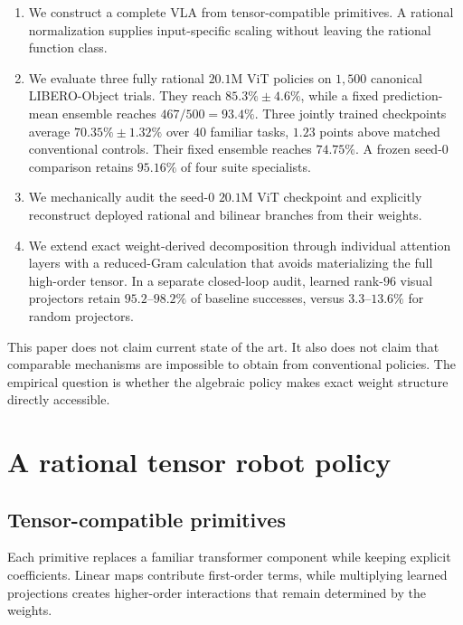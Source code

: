 \documentclass{article}
\begin{document}
\begin{enumerate}
  \item We construct a complete VLA from tensor-compatible primitives. A rational normalization
        supplies input-specific scaling without leaving the rational function class.
  \item We evaluate three fully rational $20.1$M ViT policies on $1{,}500$ canonical
        LIBERO-Object trials. They reach $85.3\%\pm4.6\%$, while a fixed prediction-mean
        ensemble reaches $467/500=93.4\%$. Three jointly trained checkpoints average
        $70.35\%\pm1.32\%$ over $40$ familiar tasks, $1.23$ points above matched
        conventional controls. Their fixed ensemble reaches
        $74.75\%$. A frozen seed-$0$ comparison retains $95.16\%$ of four suite specialists.
  \item We mechanically audit the seed-$0$ $20.1$M ViT checkpoint and explicitly reconstruct deployed
        rational and bilinear branches from their weights.
  \item We extend exact weight-derived decomposition through individual attention layers with a
        reduced-Gram calculation that avoids materializing the full high-order tensor. In a
        separate closed-loop audit, learned rank-$96$ visual projectors retain $95.2$--$98.2\%$ of
        baseline successes, versus $3.3$--$13.6\%$ for random projectors.
\end{enumerate}

This paper does not claim current state of the art. It also does not claim that comparable
mechanisms are impossible to obtain from conventional policies. The empirical question is
whether the algebraic policy makes exact weight structure directly accessible.

\section{A rational tensor robot policy}
\label{sec:model}

\subsection{Tensor-compatible primitives}

Each primitive replaces a familiar transformer component while keeping explicit coefficients.
Linear maps contribute first-order terms, while multiplying learned projections creates
higher-order interactions that remain determined by the weights.
\end{document}
